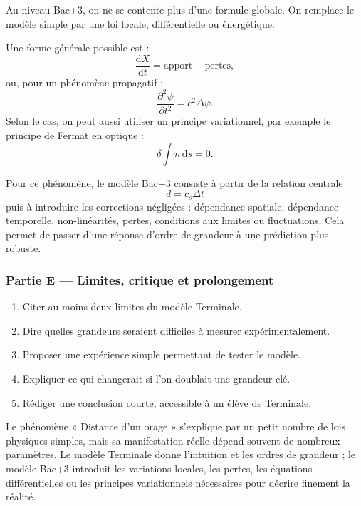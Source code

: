 \documentclass[11pt,a4paper]{article}
\begin{document}
\begin{approfondissementbox}
Au niveau Bac+3, on ne se contente plus d'une formule globale. On remplace le modèle simple par une loi locale, différentielle ou énergétique.

Une forme générale possible est :
\[
\frac{\mathrm d X}{\mathrm dt}=\text{apport}-\text{pertes},
\]
ou, pour un phénomène propagatif :
\[
\frac{\partial^2 \psi}{\partial t^2}=c^2\Delta\psi.
\]
Selon le cas, on peut aussi utiliser un principe variationnel, par exemple le principe de Fermat en optique :
\[
\delta \int n\,\mathrm ds=0.
\]

Pour ce phénomène, le modèle Bac+3 consiste à partir de la relation centrale
\[
d=c_s\Delta t
\]
puis à introduire les corrections négligées : dépendance spatiale, dépendance temporelle, non-linéarités, pertes, conditions aux limites ou fluctuations. Cela permet de passer d'une réponse d'ordre de grandeur à une prédiction plus robuste.
\end{approfondissementbox}

\subsubsection*{Partie E — Limites, critique et prolongement}

\begin{enumerate}
  \item Citer au moins deux limites du modèle Terminale.
  \item Dire quelles grandeurs seraient difficiles à mesurer expérimentalement.
  \item Proposer une expérience simple permettant de tester le modèle.
  \item Expliquer ce qui changerait si l'on doublait une grandeur clé.
  \item Rédiger une conclusion courte, accessible à un élève de Terminale.
\end{enumerate}

\begin{corrigebox}
Le phénomène « Distance d'un orage » s'explique par un petit nombre de lois physiques simples, mais sa manifestation réelle dépend souvent de nombreux paramètres. Le modèle Terminale donne l'intuition et les ordres de grandeur ; le modèle Bac+3 introduit les variations locales, les pertes, les équations différentielles ou les principes variationnels nécessaires pour décrire finement la réalité.
\end{corrigebox}
\end{document}
